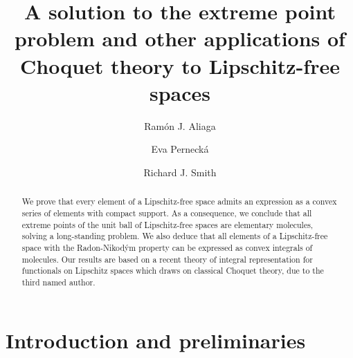 \documentclass[a4paper,10pt]{amsart}
\theoremstyle{plain}
\theoremstyle{definition}
\theoremstyle{remark}
\begin{document}
\title[Extreme points and Choquet theory of free spaces]{A solution to the extreme point problem and other applications of Choquet theory to Lipschitz-free spaces}


\author[R. J. Aliaga]{Ram\'on J. Aliaga}
\address[R. J. Aliaga]{Instituto Universitario de Matem\'atica Pura y Aplicada,
Universitat Polit\`ecnica de Val\`encia,
Camino de Vera S/N,
46022 Valencia, Spain}

\author[E. Perneck\'a]{Eva Perneck\'a}
\address[E. Perneck\'a]{Faculty of Information Technology, Czech Technical University in Prague, Th\'akurova 9, 160 00, Prague 6, Czech Republic}

\author[R. J. Smith]{Richard J. Smith}
\address[R. J. Smith]{School of Mathematics and Statistics, University College Dublin, Belfield, Dublin 4, Ireland}

\date{}


\begin{abstract}
We prove that every element of a Lipschitz-free space admits an expression as a convex series of elements with compact support. As a consequence, we conclude that all extreme points of the unit ball of Lipschitz-free spaces are elementary molecules, solving a long-standing problem. We also deduce that all elements of a Lipschitz-free space with the Radon-Nikod\'ym property can be expressed as convex integrals of molecules. Our results are based on a recent theory of integral representation for functionals on Lipschitz spaces which draws on classical Choquet theory, due to the third named author.
\end{abstract}




\maketitle


\section{Introduction and preliminaries}
\label{sec:introduction}
\end{document}
